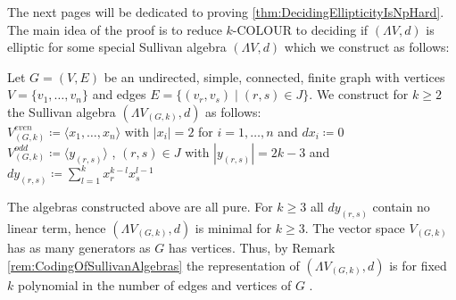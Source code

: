  The next pages will be dedicated to proving \ref{thm:DecidingEllipticityIsNpHard}.
 The main idea of the proof is to reduce $k$-COLOUR to deciding if $(\Lambda V,d)$ is elliptic for some special 
 Sullivan algebra $(\Lambda V,d)$ which we construct as follows: \\
 
 \begin{Construction}
 \label{constructionOfSullivanAlgebra}
 Let $G = (V,E)$ be an undirected, simple, connected, finite graph with vertices $ V = \lbrace v_1, \dotsc , v_n \rbrace $
 and edges $ E = \lbrace (v_r, v_s) \; | \; (r,s) \in J \rbrace$. We construct for $k \geq 2$ the 
 Sullivan algebra $(\Lambda V_{(G,k)} , d)$ as follows: \\
 
 $ V^{even}_{(G,k)} \coloneqq \langle x_1, \dotsc , x_n \rangle $ \; with \; $|x_i| = 2$ \; for \; $ i = 1, \dotsc , n$ \; 
 and \; $dx_i \coloneqq 0$ \\
 
 $V^{odd}_{(G,k)} \coloneqq \langle y_{(r,s)} \rangle$ , $(r,s) \in J$ \; with \; $|y_{(r,s)}| = 2k - 3$ \; and \; $dy_{(r,s)} \coloneqq 
 \sum_{l = 1}^k x_r^{k -l} x_s^{l - 1}$ \\
 
 \end{Construction}

\begin{Remark}
  The algebras constructed above are all pure. For 
  $k \geq 3$ all $dy_{(r,s)}$ contain no linear term, hence
  $(\Lambda V_{(G,k)} ,d)$ is minimal for $k \geq 3$.
  The vector space
  $V_{(G,k)}$ has as many generators as $G$ has vertices. Thus, by Remark \ref{rem:CodingOfSullivanAlgebras}
  the representation of $(\Lambda V_{(G,k)} ,d)$ is for fixed $k$ polynomial in the number of edges and vertices of $G$ .
%   
%   
\end{Remark}

